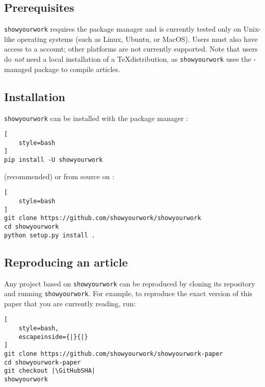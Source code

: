 \documentclass{aastex631}
\newcommand\syw{\texttt{showyourwork}\xspace}
\begin{document}
\subsection{Prerequisites}
\label{sec:usage:prereq}
\syw requires the \conda package manager and is currently tested only on Unix-like operating systems (such as Linux, Ubuntu, or MacOS).
Users must also have access to a \GitHub account; other \git platforms are not currently supported.
Note that users do \emph{not} need a local installation of a \TeX distribution, as \syw uses the \conda-managed \tectonic package to compile articles.

\subsection{Installation}
\label{sec:usage:install}
\syw can be installed with the \Python package manager \pip:\\

\noindent\begin{minipage}{\linewidth}
\begin{lstlisting}[
    style=bash
]
pip install -U showyourwork
\end{lstlisting}
\end{minipage}

\noindent (recommended) or from source on \GitHub:\\

\noindent\begin{minipage}{\linewidth}
\begin{lstlisting}[
    style=bash
]
git clone https://github.com/showyourwork/showyourwork
cd showyourwork
python setup.py install .
\end{lstlisting}
\end{minipage}

\subsection{Reproducing an article}
\label{sec:usage:reproduce}
Any project based on \syw can be reproduced by cloning its \GitHub repository and running \syw. For example, to reproduce the exact version of this paper that you are currently reading, run:\\

\noindent\begin{minipage}{\linewidth}
\begin{lstlisting}[
    style=bash,
    escapeinside={|}{|}
]
git clone https://github.com/showyourwork/showyourwork-paper
cd showyourwork-paper
git checkout |\GitHubSHA|
showyourwork
\end{lstlisting}
\end{minipage}
\end{document}
